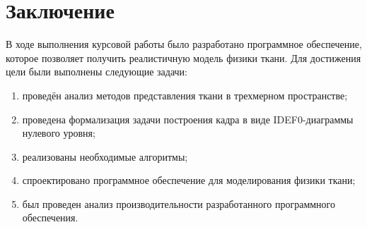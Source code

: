 \chapter*{Заключение}

В ходе выполнения курсовой работы было разработано программное обеспечение, которое позволяет получить реалистичную модель физики ткани.
Для достижения цели были выполнены следующие задачи:
\begin{enumerate}[label=\arabic*)]
    \item проведён анализ методов представления ткани в трехмерном пространстве;
    \item проведена формализация задачи построения кадра в виде IDEF0-диаграммы нулевого уровня;
    \item реализованы необходимые алгоритмы;
    \item спроектировано программное обеспечение для моделирования физики ткани;
    \item был проведен анализ производительности разработанного программного обеспечения.
\end{enumerate}
